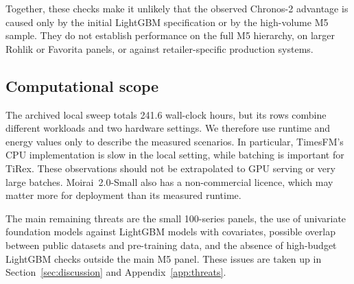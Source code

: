 \begin{table}[htbp]
\centering
\caption{M5 scaled-error sensitivity for Chronos-2 on the matched panel.}
\label{tab:m5-panel-scaled}
\small

\end{table}

Together, these checks make it unlikely that the observed Chronos-2 advantage
is caused only by the initial LightGBM specification or by the high-volume M5
sample. They do not establish performance on the full M5 hierarchy, on larger
Rohlik or Favorita panels, or against retailer-specific production systems.

\subsection{Computational scope}
\label{sec:costenvelope}

The archived local sweep totals 241.6 wall-clock hours, but its rows combine
different workloads and two hardware settings. We therefore use runtime and
energy values only to describe the measured scenarios. In particular,
TimesFM's CPU implementation is slow in the local setting, while batching is
important for TiRex. These observations should not be extrapolated to GPU
serving or very large batches. Moirai~2.0-Small also has a non-commercial
licence, which may matter more for deployment than its measured runtime.

The main remaining threats are the small 100-series panels, the use of
univariate foundation models against LightGBM models with covariates, possible
overlap between public datasets and pre-training data, and the absence of
high-budget LightGBM checks outside the main M5 panel. These issues are taken
up in Section~\ref{sec:discussion} and Appendix~\ref{app:threats}.
\label{sec:fm_threats}\label{sec:table59}
